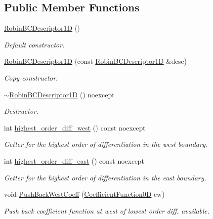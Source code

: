 \subsection*{Public Member Functions}
\begin{DoxyCompactItemize}
\item 
\hyperlink{classmtk_1_1RobinBCDescriptor1D_a49ae1e976c1a6d8aa227d3dc16090127}{Robin\+B\+C\+Descriptor1\+D} ()
\begin{DoxyCompactList}\small\item\em Default constructor. \end{DoxyCompactList}\item 
\hyperlink{classmtk_1_1RobinBCDescriptor1D_ac8d3d6f0b5b1882e098b89cc212fffa1}{Robin\+B\+C\+Descriptor1\+D} (const \hyperlink{classmtk_1_1RobinBCDescriptor1D}{Robin\+B\+C\+Descriptor1\+D} \&desc)
\begin{DoxyCompactList}\small\item\em Copy constructor. \end{DoxyCompactList}\item 
\hyperlink{classmtk_1_1RobinBCDescriptor1D_a247cdbba1ae673d576b71829f2b82736}{$\sim$\+Robin\+B\+C\+Descriptor1\+D} () noexcept
\begin{DoxyCompactList}\small\item\em Destructor. \end{DoxyCompactList}\item 
int \hyperlink{classmtk_1_1RobinBCDescriptor1D_a1935b9e2e560ea5f176ac6e0a3823d50}{highest\+\_\+order\+\_\+diff\+\_\+west} () const noexcept
\begin{DoxyCompactList}\small\item\em Getter for the highest order of differentiation in the west boundary. \end{DoxyCompactList}\item 
int \hyperlink{classmtk_1_1RobinBCDescriptor1D_a2e7419a5cd02721104bf9c1e52b6fb61}{highest\+\_\+order\+\_\+diff\+\_\+east} () const noexcept
\begin{DoxyCompactList}\small\item\em Getter for the highest order of differentiation in the east boundary. \end{DoxyCompactList}\item 
void \hyperlink{classmtk_1_1RobinBCDescriptor1D_acdf8a75f8c39b3b8a032af81e0fd2e89}{Push\+Back\+West\+Coeff} (\hyperlink{group__c07-mim__ops_ga04276745b4d511f0f3c636d6e0df7c2d}{Coefficient\+Function0\+D} cw)
\begin{DoxyCompactList}\small\item\em Push back coefficient function at west of lowest order diff. available. \end{DoxyCompactList}\item 

\end{DoxyCompactItemize}
